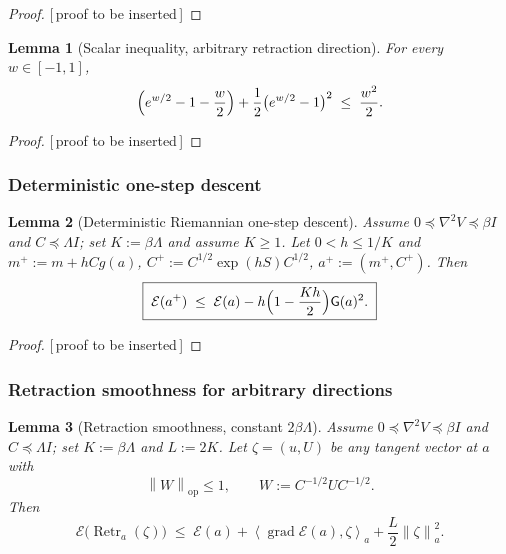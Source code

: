 \documentclass[11pt]{article}
\theoremstyle{plain}
\newtheorem{lemma}[lemma]{Lemma}
\theoremstyle{definition}
\theoremstyle{remark}
\newcommand{\Id}{I}
\newcommand{\grad}{\operatorname{grad}}
\newcommand{\op}{\mathrm{op}}
\newcommand{\calE}{\mathcal{E}}
\newcommand{\norm}[1]{\left\lVert #1\right\rVert}
\newcommand{\inner}[2]{\left\langle #1,#2\right\rangle}
\newcommand{\Gradnorm}{\mathsf{G}}
\newcommand{\Retr}{\operatorname{Retr}}
\newcommand{\PROOFHOLE}{{\color{red}\textsf{[\,proof to be inserted\,]}}}
\begin{document}
\begin{proof}
\PROOFHOLE
\end{proof}

\begin{lemma}[Scalar inequality, arbitrary retraction direction]
\label{lem:scalar-stoch}
For every $w\in[-1,1]$,
\begin{equation}
\label{eq:scalar-stoch}
    \Bigl(e^{w/2}-1-\frac w2\Bigr)+\frac12\bigl(e^{w/2}-1\bigr)^2\;\leq\;\frac{w^2}2 .
\end{equation}
\end{lemma}

\begin{proof}
\PROOFHOLE
\end{proof}

\subsubsection{Deterministic one-step descent}

\begin{lemma}[Deterministic Riemannian one-step descent]
\label{lem:det-descent}
Assume $0\preceq\nabla^2V\preceq\beta\Id$ and $C\preceq\Lambda\Id$; set $K:=\beta\Lambda$ and
assume $K\geq1$. Let $0<h\leq1/K$ and
$m^+:=m+hCg(a)$, $C^+:=C^{1/2}\exp(hS)C^{1/2}$, $a^+:=(m^+,C^+)$. Then
\begin{equation}
\label{eq:det-descent}
    \boxed{\;
    \calE(a^+)\;\leq\;\calE(a)-h\Bigl(1-\frac{Kh}2\Bigr)\Gradnorm(a)^2 .
    \;}
\end{equation}
\end{lemma}

\begin{proof}
\PROOFHOLE
\end{proof}

\subsubsection{Retraction smoothness for arbitrary directions}

\begin{lemma}[Retraction smoothness, constant $2\beta\Lambda$]
\label{lem:retr-smooth}
Assume $0\preceq\nabla^2V\preceq\beta\Id$ and $C\preceq\Lambda\Id$; set $K:=\beta\Lambda$ and
$L:=2K$. Let $\zeta=(u,U)$ be any tangent vector at $a$ with
\begin{equation}
\label{eq:scope}
    \norm{W}_\op\leq1,\qquad W:=C^{-1/2}UC^{-1/2}.
\end{equation}
Then
\begin{equation}
\label{eq:retr-smooth}
    \boxed{\;
    \calE\bigl(\Retr_a(\zeta)\bigr)
    \;\leq\;
    \calE(a)+\inner{\grad\calE(a)}{\zeta}_a+\frac L2\norm{\zeta}_a^2 .
    \;}
\end{equation}
\end{lemma}
\end{document}
